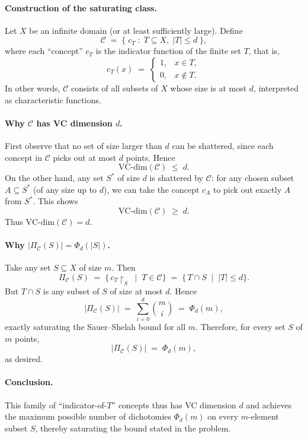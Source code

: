 \documentclass[11pt]{article}
\DeclareMathOperator{\1}{\mathbbm{1}}
\begin{document}
\paragraph{Construction of the saturating class.}
Let $X$ be an infinite domain (or at least sufficiently large). Define
\[
\mathcal{C} \;=\; \bigl\{\;c_T \;:\; T\subseteq X,\;\lvert T\rvert \le d\;\bigr\},
\]
where each ``concept'' $c_T$ is the indicator function of the finite set $T$, that is,
\[
c_T(x) \;=\;
\begin{cases}
1, & x\in T,\\
0, & x\notin T.
\end{cases}
\]
In other words, $\mathcal{C}$ consists of all subsets of $X$ whose size is at most $d$, interpreted as characteristic functions.

\paragraph{Why $\mathcal{C}$ has VC dimension $d$.}
First observe that no set of size larger than $d$ can be shattered, since each concept in $\mathcal{C}$ picks out at most $d$ points.  Hence
\[
\text{VC-dim}(\mathcal{C}) \;\le\; d.
\]
On the other hand, any set $S^*$ of size $d$ is shattered by $\mathcal{C}$: for any chosen subset $A\subseteq S^*$ (of any size up to $d$), we can take the concept $c_{A}$ to pick out exactly $A$ from $S^*$.  This shows
\[
\text{VC-dim}(\mathcal{C}) \;\ge\; d.
\]
Thus $\text{VC-dim}(\mathcal{C})=d$.

\paragraph{Why $\lvert \Pi_{\mathcal{C}}(S)\rvert = \Phi_d(\lvert S\rvert)$.}
Take any set $S\subseteq X$ of size $m$.  Then
\[
\Pi_{\mathcal{C}}(S)
\;=\;
\{\, c_T\!\restriction_{S}\;\mid\; T\in \mathcal{C}\}
\;=\;
\{\,T\cap S\;\mid\; |T|\le d\}.
\]
But $T\cap S$ is any subset of $S$ of size at most $d$.  Hence
\[
\bigl\lvert \Pi_{\mathcal{C}}(S)\bigr\rvert
\;=\;
\sum_{i=0}^d \binom{m}{i}
\;=\;
\Phi_d(m),
\]
exactly saturating the Sauer--Shelah bound for all $m$.  Therefore, for every set $S$ of $m$ points,
\[
\bigl\lvert \Pi_{\mathcal{C}}(S)\bigr\rvert
\;=\;
\Phi_d(m),
\]
as desired.

\paragraph{Conclusion.}
This family of ``indicator-of-$T$'' concepts thus has VC dimension $d$ and achieves the maximum possible number of dichotomies $\Phi_d(m)$ on every $m$-element subset $S$, thereby saturating the bound stated in the problem.
\end{document}
